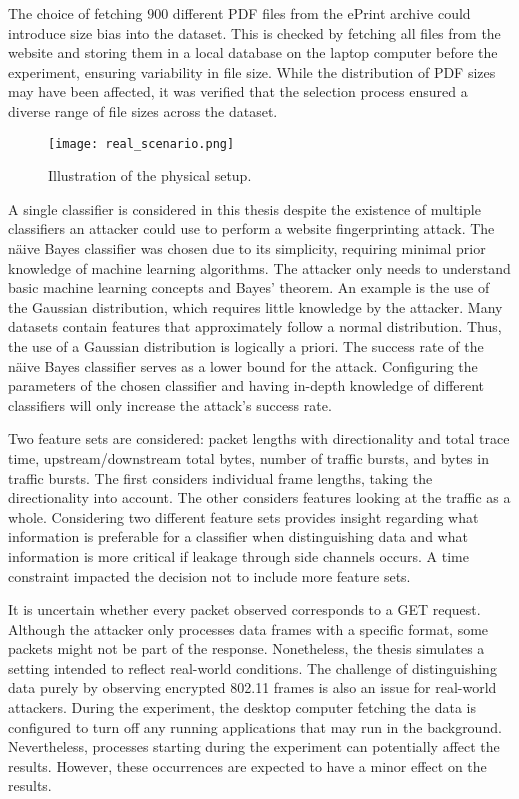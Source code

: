 The choice of fetching $900$ different PDF files from the ePrint archive could introduce size bias into the dataset. This is checked by fetching all files from the website and storing them in a local database on the laptop computer before the experiment, ensuring variability in file size. While the distribution of PDF sizes may have been affected, it was verified that the selection process ensured a diverse range of file sizes across the dataset.

\begin{figure}
	\centering
        \texttt{[image: real\_scenario.png]}
        \caption{Illustration of the physical setup.}
    \label{fig:real_scenario}
\end{figure}

A single classifier is considered in this thesis despite the existence of multiple classifiers an attacker could use to perform a website fingerprinting attack. The näive Bayes classifier was chosen due to its simplicity, requiring minimal prior knowledge of machine learning algorithms. The attacker only needs to understand basic machine learning concepts and Bayes' theorem. An example is the use of the Gaussian distribution, which requires little knowledge by the attacker. Many datasets contain features that approximately follow a normal distribution. Thus, the use of a Gaussian distribution is logically a priori. The success rate of the näive Bayes classifier serves as a lower bound for the attack. Configuring the parameters of the chosen classifier and having in-depth knowledge of different classifiers will only increase the attack's success rate.

Two feature sets are considered: packet lengths with directionality and total trace time, upstream/downstream total bytes, number of traffic bursts, and bytes in traffic bursts. The first considers individual frame lengths, taking the directionality into account. The other considers features looking at the traffic as a whole. Considering two different feature sets provides insight regarding what information is preferable for a classifier when distinguishing data and what information is more critical if leakage through side channels occurs. A time constraint impacted the decision not to include more feature sets.

It is uncertain whether every packet observed corresponds to a GET request. Although the attacker only processes data frames with a specific format, some packets might not be part of the response. Nonetheless, the thesis simulates a setting intended to reflect real-world conditions. The challenge of distinguishing data purely by observing encrypted 802.11 frames is also an issue for real-world attackers. During the experiment, the desktop computer fetching the data is configured to turn off any running applications that may run in the background. Nevertheless, processes starting during the experiment can potentially affect the results. However, these occurrences are expected to have a minor effect on the results.

